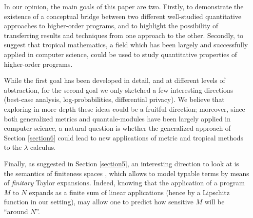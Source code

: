 


In our opinion, the main goals of this paper are two. Firstly,  to
demonstrate the existence of a conceptual bridge between two different well-studied quantitative approaches to higher-order programs, and to highlight the possibility of transferring results and techniques from one approach to the other. 
Secondly, to suggest that tropical mathematics, a
field which has been largely and successfully applied in computer science, could be used to study quantitative properties of higher-order programs.

While the first goal has been developed in detail, and at different levels of abstraction, for the second goal we only sketched a few interesting directions (best-case analysis, log-probabilities, differential privacy). We believe that exploring in more depth these ideas could be a fruitful direction; moreover, 
since both generalized metrics and quantale-modules have been largely applied in computer science, 
a natural question is whether the generalized approach of Section \ref{section6} could  lead to new applications of metric and tropical methods to the $\lambda$-calculus.

Finally, as suggested in Section \ref{section5}, an interesting direction to look at is the semantics of finiteness spaces \cite{Ehrhard2005}, which allows to model typable terms by means of \emph{finitary} Taylor expansions. Indeed, knowing that the application of a program $M$ to $N$ expands as a finite sum of linear applications (hence by a Lipschitz function in our setting), may allow one to predict how sensitive $M$ will be ``around $N$''.
%
%
%
%
%
%
%
%
%
%
